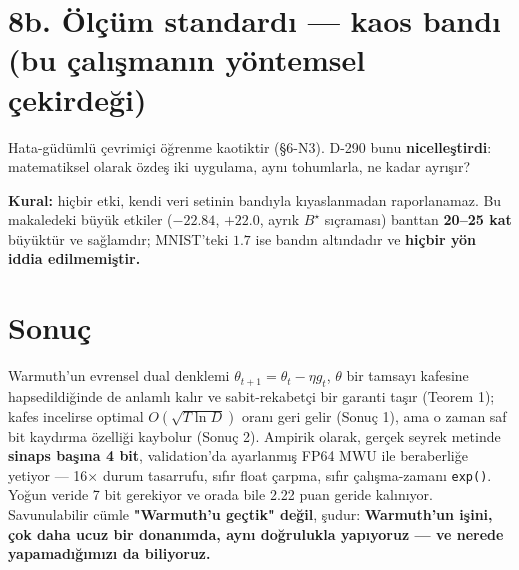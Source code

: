 \documentclass[11pt]{article}
\newenvironment{notkutu}{\def\FrameCommand{\fboxsep=6pt\colorbox{kutu}}\MakeFramed{\advance\hsize-\width\FrameRestore}\small}{\endMakeFramed}
\begin{document}
\section*{8b. Ölçüm standardı — kaos bandı (bu çalışmanın yöntemsel çekirdeği)}
Hata-güdümlü çevrimiçi öğrenme kaotiktir (§6-N3). D-290 bunu \textbf{nicelleştirdi}: matematiksel olarak özdeş iki uygulama, aynı tohumlarla, ne kadar ayrışır?
\begin{center}\small{}\end{center}
\textbf{Kural:} hiçbir etki, kendi veri setinin bandıyla kıyaslanmadan raporlanamaz. Bu makaledeki büyük etkiler ($-22.84$, $+22.0$, ayrık $B^\star$ sıçraması) banttan \textbf{20–25 kat} büyüktür ve sağlamdır; MNIST'teki $1.7$ ise bandın altındadır ve \textbf{hiçbir yön iddia edilmemiştir.}
\section*{Sonuç}
Warmuth'un evrensel dual denklemi $\theta_{t+1}=\theta_t-\eta g_t$, $\theta$ bir tamsayı kafesine hapsedildiğinde de anlamlı kalır ve sabit-rekabetçi bir garanti taşır (Teorem 1); kafes incelirse optimal $O(\sqrt{T\ln D})$ oranı geri gelir (Sonuç 1), ama o zaman saf bit kaydırma özelliği kaybolur (Sonuç 2).
Ampirik olarak, gerçek seyrek metinde \textbf{sinaps başına 4 bit}, validation'da ayarlanmış FP64 MWU ile beraberliğe yetiyor — 16× durum tasarrufu, sıfır float çarpma, sıfır çalışma-zamanı \texttt{exp()}. Yoğun veride 7 bit gerekiyor ve orada bile 2.22 puan geride kalınıyor.
Savunulabilir cümle \textbf{"Warmuth'u geçtik" değil}, şudur:
\begin{notkutu}\textbf{Warmuth'un işini, çok daha ucuz bir donanımda, aynı doğrulukla yapıyoruz — ve nerede yapamadığımızı da biliyoruz.}
\end{notkutu}
\end{document}
